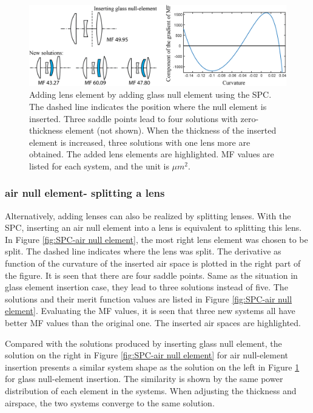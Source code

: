 \begin{figure}[h!]
    \centering
    \includegraphics[scale=0.68]{chapter-2/figures/spc_add_glass.png}
    \caption{Adding lens element by adding glass null element using the SPC. The dashed line indicates the position where the null element is inserted. Three saddle points lead to four solutions with zero-thickness element (not shown). When the thickness of the inserted element is increased, three solutions with one lens more are obtained. The added lens elements are highlighted. MF values are listed for each system, and the unit is $\mu m^2$. }
    \label{fig:SPC-glass null element}
\end{figure}

\subsubsection{air null element- splitting a lens}

Alternatively, adding lenses can also be realized by splitting lenses. With the SPC, inserting an air null element into a lens is equivalent to splitting this lens. In Figure \ref{fig:SPC-air null element}, the most right lens element was chosen to be split. The dashed line indicates where the lens was split. The derivative as function of the curvature of the inserted air space is plotted in the right part of the figure. It is seen that there are four saddle points. Same as the situation in glass element insertion case, they lead to three solutions instead of five. The solutions and their merit function values are listed in Figure \ref{fig:SPC-air null element}. Evaluating the MF values, it is seen that three new systems all have better MF values than the original one. The inserted air spaces are highlighted.

Compared with the solutions produced by inserting glass null element, the solution on the right in Figure \ref{fig:SPC-air null element} for air null-element insertion presents a similar system shape as the solution on the left in Figure \ref{fig:SPC-glass null element} for glass null-element insertion. The similarity is shown by the same power distribution of each element in the systems. When adjusting the thickness and airspace, the two systems converge to the same solution. 


